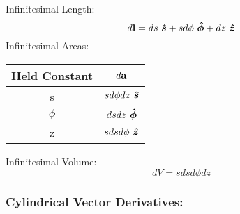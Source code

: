     \newpage\noindent
    Infinitesimal Length:
        \[\dl*= ds\ \e{s}+sd\phi\ \e{\phi}+dz\ \e{z}\]
    Infinitesimal Areas:
        \begin{center}
        \begin{tabular}{|c|c|}
            \hline
            Held Constant & $\da*$ \\ 
            \hline
            s & $sd\phi dz\ \e{s}$ \\ 
            \hline
            $\phi$ & $dsdz\ \e{\phi}$  \\ 
            \hline
            z & $sdsd\phi\ \e{z}$\\
            \hline
        \end{tabular}
        \end{center}
    Infinitesimal Volume: \[dV=sdsd\phi dz\]
    \subsubsection*{Cylindrical Vector Derivatives:}
    \length[0.7cm]
